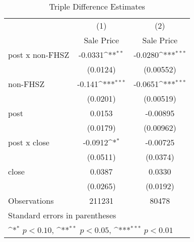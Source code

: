 \begin{table}[htbp]\centering
\def\sym#1{\ifmmode^{#1}\else\(^{#1}\)\fi}
\caption{Triple Difference Estimates\label{tabl}}
\begin{tabular}{l*{2}{c}}
\hline\hline
                    &\multicolumn{1}{c}{(1)}&\multicolumn{1}{c}{(2)}\\
                    &\multicolumn{1}{c}{Sale Price}&\multicolumn{1}{c}{Sale Price}\\
\hline
post x non-FHSZ     &     -0.0331\sym{**} &     -0.0280\sym{***}\\
                    &    (0.0124)         &   (0.00552)         \\
[1em]
non-FHSZ            &      -0.141\sym{***}&     -0.0651\sym{***}\\
                    &    (0.0201)         &   (0.00519)         \\
[1em]
post                &      0.0153         &    -0.00895         \\
                    &    (0.0179)         &   (0.00962)         \\
[1em]
post x close        &     -0.0912\sym{*}  &    -0.00725         \\
                    &    (0.0511)         &    (0.0374)         \\
[1em]
close               &      0.0387         &      0.0330         \\
                    &    (0.0265)         &    (0.0192)         \\
\hline
Observations        &      211231         &       80478         \\
\hline\hline
\multicolumn{3}{l}{\footnotesize Standard errors in parentheses}\\
\multicolumn{3}{l}{\footnotesize \sym{*} \(p<0.10\), \sym{**} \(p<0.05\), \sym{***} \(p<0.01\)}\\
\end{tabular}
\end{table}
